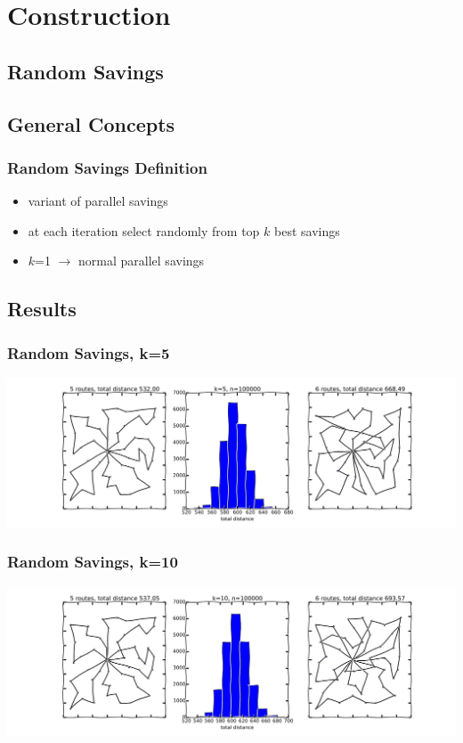 \documentclass{beamer}
\begin{document}
\section{Construction}


\subsection{Random Savings}

\subsection{General Concepts}
\begin{frame}
\frametitle{Random Savings Definition}
\begin{itemize}
	\item variant of parallel savings
	\item at each iteration select randomly from top $k$ best savings
	\item $k$=1 $\rightarrow$ normal parallel savings
\end{itemize}
\end{frame}


\subsection{Results}
\begin{frame}
\frametitle{Random Savings, k=5}
\begin{center}
\includegraphics[scale=0.25]{figs/random_savings5}

\end{center}
\end{frame}


\begin{frame}
\frametitle{Random Savings, k=10}
\begin{center}
\includegraphics[scale=0.25]{figs/random_savings10}

\end{center}
\end{frame}
\end{document}
